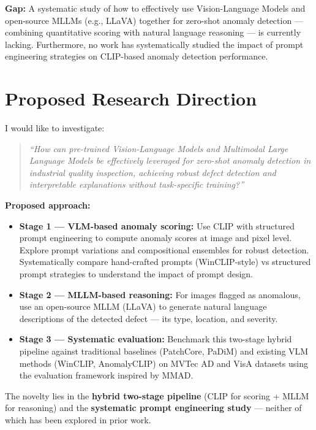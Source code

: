 \documentclass[12pt, a4paper]{article}
\begin{document}
\textbf{Gap:} A systematic study of how to effectively use Vision-Language Models and open-source MLLMs (e.g., LLaVA) together for zero-shot anomaly detection --- combining quantitative scoring with natural language reasoning --- is currently lacking. Furthermore, no work has systematically studied the impact of prompt engineering strategies on CLIP-based anomaly detection performance.

\section{Proposed Research Direction}

I would like to investigate:

\begin{quote}
\textit{``How can pre-trained Vision-Language Models and Multimodal Large Language Models be effectively leveraged for zero-shot anomaly detection in industrial quality inspection, achieving robust defect detection and interpretable explanations without task-specific training?''}
\end{quote}

\textbf{Proposed approach:}
\begin{itemize}[leftmargin=*]
    \item \textbf{Stage 1 --- VLM-based anomaly scoring:} Use CLIP with structured prompt engineering to compute anomaly scores at image and pixel level. Explore prompt variations and compositional ensembles for robust detection. Systematically compare hand-crafted prompts (WinCLIP-style) vs structured prompt strategies to understand the impact of prompt design.
    \item \textbf{Stage 2 --- MLLM-based reasoning:} For images flagged as anomalous, use an open-source MLLM (LLaVA) to generate natural language descriptions of the detected defect --- its type, location, and severity.
    \item \textbf{Stage 3 --- Systematic evaluation:} Benchmark this two-stage hybrid pipeline against traditional baselines (PatchCore, PaDiM) and existing VLM methods (WinCLIP, AnomalyCLIP) on MVTec AD and VisA datasets using the evaluation framework inspired by MMAD.
\end{itemize}

The novelty lies in the \textbf{hybrid two-stage pipeline} (CLIP for scoring + MLLM for reasoning) and the \textbf{systematic prompt engineering study} --- neither of which has been explored in prior work.
\end{document}
